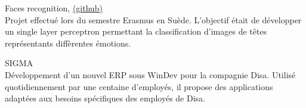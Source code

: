 \medskip

{\large Faces recognition, \href{https://github.com/ThomasRanvier/faces_recognition_nn}{(github)}}
\\
{\small Projet effectu\'e lors du semestre Erasmus en Su\`ede.
L'objectif \'etait de d\'evelopper un single layer perceptron permettant la classification d'images de t\^etes représentants diff\`erentes \'emotions.}

\medskip

{\large SIGMA}
\\
{\small D\'eveloppement d'un nouvel ERP sous WinDev pour la compagnie Disa.
Utilis\'e quotidiennement par une centaine d'employ\'es, il propose des applications adapt\'ees aux besoins sp\'ecifiques des employ\'es de Disa.}

\medskip


